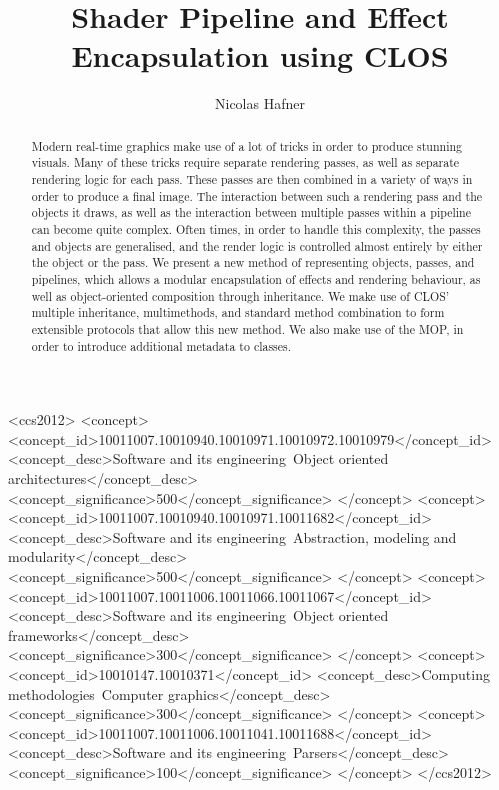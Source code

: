 \documentclass[format=sigconf]{acmart}
\begin{document}
\title{Shader Pipeline and Effect Encapsulation using CLOS}

\author{Nicolas Hafner}

\begin{abstract}
  Modern real-time graphics make use of a lot of tricks in order to produce stunning visuals. Many of these tricks require separate rendering passes, as well as separate rendering logic for each pass. These passes are then combined in a variety of ways in order to produce a final image. The interaction between such a rendering pass and the objects it draws, as well as the interaction between multiple passes within a pipeline can become quite complex. Often times, in order to handle this complexity, the passes and objects are generalised, and the render logic is controlled almost entirely by either the object or the pass. We present a new method of representing objects, passes, and pipelines, which allows a modular encapsulation of effects and rendering behaviour, as well as object-oriented composition through inheritance. We make use of CLOS' multiple inheritance, multimethods, and standard method combination to form extensible protocols that allow this new method. We also make use of the MOP, in order to introduce additional metadata to classes.
\end{abstract}

\begin{CCSXML}
  <ccs2012>
  <concept>
  <concept_id>10011007.10010940.10010971.10010972.10010979</concept_id>
  <concept_desc>Software and its engineering~Object oriented architectures</concept_desc>
  <concept_significance>500</concept_significance>
  </concept>
  <concept>
  <concept_id>10011007.10010940.10010971.10011682</concept_id>
  <concept_desc>Software and its engineering~Abstraction, modeling and modularity</concept_desc>
  <concept_significance>500</concept_significance>
  </concept>
  <concept>
  <concept_id>10011007.10011006.10011066.10011067</concept_id>
  <concept_desc>Software and its engineering~Object oriented frameworks</concept_desc>
  <concept_significance>300</concept_significance>
  </concept>
  <concept>
  <concept_id>10010147.10010371</concept_id>
  <concept_desc>Computing methodologies~Computer graphics</concept_desc>
  <concept_significance>300</concept_significance>
  </concept>
  <concept>
  <concept_id>10011007.10011006.10011041.10011688</concept_id>
  <concept_desc>Software and its engineering~Parsers</concept_desc>
  <concept_significance>100</concept_significance>
  </concept>
  </ccs2012>
\end{CCSXML}
\end{document}
